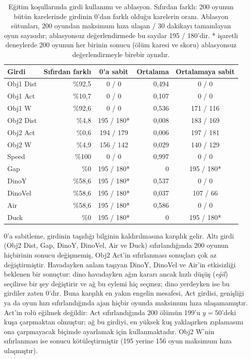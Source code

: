 \documentclass[11pt,a4paper]{article}
\begin{document}
\begin{table}[!htbp]
  \centering
  \small
  \caption{Eğitim koşullarında girdi kullanımı ve ablasyon. Sıfırdan farklı: 200 oyunun bütün karelerinde girdinin 0'dan farklı olduğu karelerin oranı. Ablasyon sütunları, 200 oyundan maksimum hıza ulaşan / 30 dakikayı tamamlayan oyun sayısıdır; ablasyonsuz değerlendirmede bu sayılar 195 / 180'dir. * işaretli deneylerde 200 oyunun her birinin sonucu (ölüm karesi ve skoru) ablasyonsuz değerlendirmeyle birebir aynıdır.}
  \label{tab:ablation}
  \begin{tabular}{@{}l r c r c@{}}
    \toprule
    Girdi & Sıfırdan farklı & 0'a sabit & Ortalama & Ortalamaya sabit \\
    \midrule
    Obj1 Dist & \%92,5 & 0 / 0 & 0,494 & 0 / 0 \\
    Obj1 Act & \%10,7 & 0 / 0 & 0,107 & 0 / 0 \\
    Obj1 W & \%92,6 & 0 / 0 & 0,536 & 171 / 116 \\
    Obj2 Dist & \%4,8 & 195 / 180* & 0,008 & 183 / 169 \\
    Obj2 Act & \%0,6 & 194 / 179 & 0,006 & 197 / 181 \\
    Obj2 W & \%4,9 & 156 / 142 & 0,029 & 140 / 129 \\
    Speed & \%100 & 0 / 0 & 0,997 & 0 / 0 \\
    Gap & \%0 & 195 / 180* & 0 & 195 / 180* \\
    DinoY & \%58,6 & 195 / 180* & 0,537 & 0 / 0 \\
    DinoVel & \%58,6 & 195 / 180* & 0,037 & 107 / 66 \\
    Air & \%58,6 & 195 / 180* & 0,586 & 0 / 0 \\
    Duck & \%0 & 195 / 180* & 0 & 195 / 180* \\
    \bottomrule
  \end{tabular}
\end{table}
\FloatBarrier

0'a sabitleme, girdinin taşıdığı bilginin kaldırılmasına karşılık gelir. Altı girdi (Obj2 Dist, Gap, DinoY, DinoVel, Air ve Duck) sıfırlandığında 200 oyunun hiçbirinin sonucu değişmemiş, Obj2 Act'in sıfırlanması sonuçları çok az değiştirmiştir. Havadayken anlam taşıyan DinoY, DinoVel ve Air'in etkisizliği beklenen bir sonuçtur: dino havadayken ağın kararı ancak hızlı düşüş (\emph{eğil}) seçilirse bir şey değiştirir ve ağ bu eylemi hiç seçmez; dino yerdeyken ise bu girdiler zaten 0'dır. Buna karşılık en yakın engelin mesafesi, Act girdisi, genişliği ya da oyun hızı sıfırlandığında ajan hiçbir oyunda maksimum hıza ulaşamamıştır. Act'in rolü eğilmek değildir: Act sıfırlandığında 200 ölümün 199'u ${y = 50}$'deki kuşa çarpmaktan olmuştur; ağ bu girdiyi, en yüksek kuş yaklaşırken zıplamasını ona çarpmayacak biçimde ayarlamak için kullanmaktadır. Obj2 W'nin sıfırlanması ise sonucu kötüleştirmiştir (195 yerine 156 oyun maksimum hıza ulaşmıştır).
\end{document}

